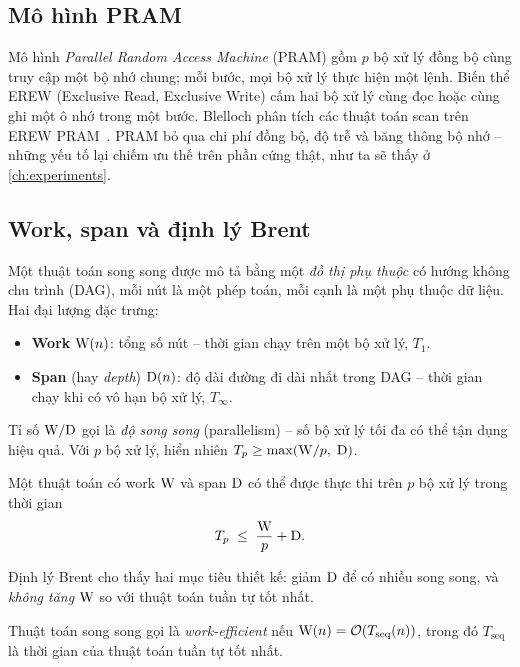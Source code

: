 \subsection{Mô hình PRAM}

Mô hình \emph{Parallel Random Access Machine} (PRAM) gồm \(p\) bộ xử lý đồng bộ cùng truy cập
một bộ nhớ chung; mỗi bước, mọi bộ xử lý thực hiện một lệnh. Biến thể EREW (Exclusive Read,
Exclusive Write) cấm hai bộ xử lý cùng đọc hoặc cùng ghi một ô nhớ trong một bước. Blelloch
phân tích các thuật toán scan trên EREW PRAM~\cite{blelloch1990}. PRAM bỏ qua chi phí đồng bộ,
độ trễ và băng thông bộ nhớ -- những yếu tố lại chiếm ưu thế trên phần cứng thật, như ta sẽ
thấy ở \cref{ch:experiments}.

\subsection{Work, span và định lý Brent}

Một thuật toán song song được mô tả bằng một \emph{đồ thị phụ thuộc} có hướng không chu trình
(DAG), mỗi nút là một phép toán, mỗi cạnh là một phụ thuộc dữ liệu. Hai đại lượng đặc trưng:
\begin{itemize}
  \item \textbf{Work} \(\mathrm{W}(n)\): tổng số nút -- thời gian chạy trên một bộ xử lý, \(T_1\).
  \item \textbf{Span} (hay \emph{depth}) \(\mathrm{D}(n)\): độ dài đường đi dài nhất trong DAG --
        thời gian chạy khi có vô hạn bộ xử lý, \(T_\infty\).
\end{itemize}
Tỉ số \(\mathrm{W}/\mathrm{D}\) gọi là \emph{độ song song} (parallelism) -- số bộ xử lý tối đa có thể tận
dụng hiệu quả. Với \(p\) bộ xử lý, hiển nhiên \(T_p \ge \max(\mathrm{W}/p,\; \mathrm{D})\).

\begin{theorem}
Một thuật toán có work \(\mathrm{W}\) và span \(\mathrm{D}\) có thể được thực thi trên \(p\) bộ xử lý trong
thời gian
\begin{equation}
  T_p \;\le\; \frac{\mathrm{W}}{p} + \mathrm{D}.
  \label{eq:brent}
\end{equation}
\end{theorem}

Định lý Brent cho thấy hai mục tiêu thiết kế: giảm \(\mathrm{D}\) để có nhiều song song, và
\emph{không tăng} \(\mathrm{W}\) so với thuật toán tuần tự tốt nhất.

\begin{definition}
Thuật toán song song gọi là \emph{work-efficient} nếu \(\mathrm{W}(n) = \mathcal{O}(T_{\text{seq}}(n))\),
trong đó \(T_{\text{seq}}\) là thời gian của thuật toán tuần tự tốt nhất.
\end{definition}


